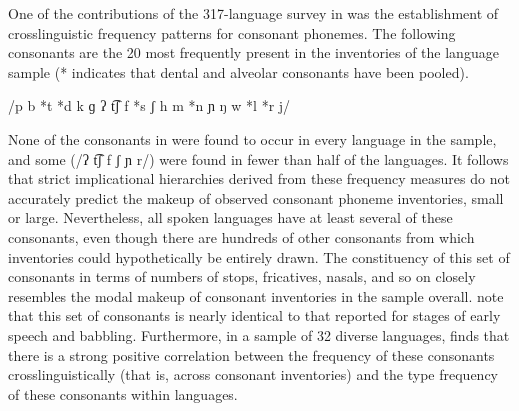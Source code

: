   One of the contributions of the 317-language survey in \citet{Maddieson1984} was the establishment of crosslinguistic frequency patterns for consonant phonemes. The following consonants are the 20 most frequently present in the inventories of the language sample (* indicates that dental and alveolar consonants have been pooled).

\ea\label{ex:4.1}
  /p b *t *d k ɡ ʔ t͡ʃ f *s ʃ h m *n ɲ ŋ w *l *r j/
\citep[12]{Maddieson1984}
\z

None of the consonants in  were found to occur in every language in the sample, and some (/ʔ t͡ʃ f ʃ ɲ r/) were found in fewer than half of the languages. It follows that strict implicational hierarchies derived from these frequency measures do not accurately predict the makeup of observed consonant phoneme inventories, small or large. Nevertheless, all spoken languages have at least several of these consonants, even though there are hundreds of other consonants from which inventories could hypothetically be entirely drawn. The constituency of this set of consonants in terms of numbers of stops, fricatives, nasals, and so on closely resembles the modal makeup of consonant inventories in the sample overall. \citet{LindblomMaddieson1988} note that this set of consonants is nearly identical to that reported for stages of early speech and babbling. Furthermore, in a sample of 32 diverse languages, \citet[73--74]{Gordon2016} finds that there is a strong positive correlation between the frequency of these consonants crosslinguistically (that is, across consonant inventories) and the type frequency of these consonants within languages.


